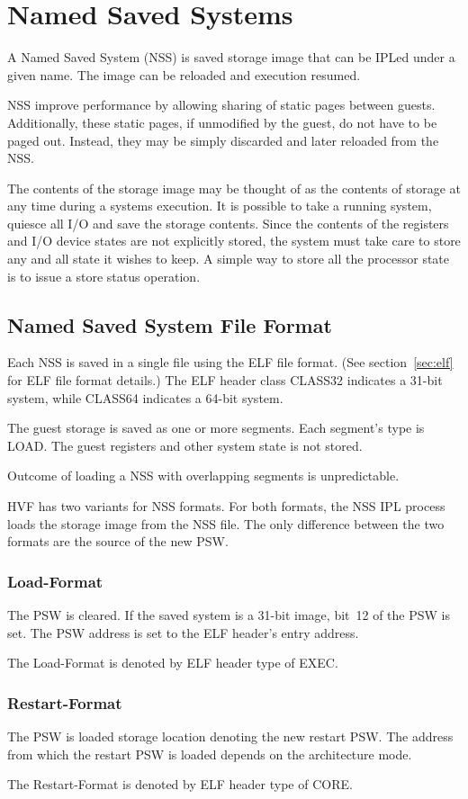 \chapter{Named Saved Systems}
\label{chap:cp-nss}
\cbstart
A Named Saved System (NSS) is saved storage image that can be IPLed under a
given name.  The image can be reloaded and execution resumed.

NSS improve performance by allowing sharing of static pages between guests.
Additionally, these static pages, if unmodified by the guest, do not have to
be paged out.  Instead, they may be simply discarded and later reloaded from
the NSS.

The contents of the storage image may be thought of as the contents of
storage at any time during a systems execution.
%
It is possible to take a running system, quiesce all I/O and save the
storage contents.  Since the contents of the registers and I/O device states
are not explicitly stored, the system must take care to store any and all
state it wishes to keep.  A simple way to store all the processor state is
to issue a store status operation.

\section{Named Saved System File Format}
Each NSS is saved in a single file using the ELF file format.  (See
section~\ref{sec:elf} for ELF file format details.)  The ELF header class
CLASS32 indicates a \mbox{31-bit} system, while CLASS64 indicates a
\mbox{64-bit} system.

The guest storage is saved as one or more segments. Each segment's type is
LOAD.  The guest registers and other system state is not stored.

Outcome of loading a NSS with overlapping segments is unpredictable.

HVF has two variants for NSS formats.  For both formats, the NSS IPL process
loads the storage image from the NSS file.  The only difference between the
two formats are the source of the new PSW.

\subsection{Load-Format}
The PSW is cleared.  If the saved system is a \mbox{31-bit} image, bit~12 of
the PSW is set.  The PSW address is set to the ELF header's entry address.

The Load-Format is denoted by ELF header type of EXEC.

\subsection{Restart-Format}

The PSW is loaded storage location denoting the new restart PSW.  The
address from which the restart PSW is loaded depends on the architecture
mode.

The Restart-Format is denoted by ELF header type of CORE.
\cbend
